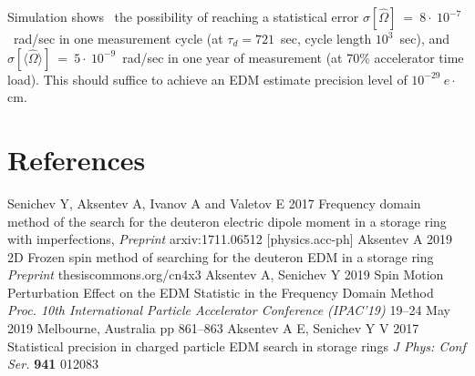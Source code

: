 \documentclass[a4paper]{jpconf}
\newcommand{\avg}[1]{\langle{#1}\rangle}
\newcommand{\W}{\Omega}
\begin{document}
Simulation shows~\cite{Stats} the possibility of reaching a statistical error $\sigma[\hat\W]~=~8\cdot~10^{-7}$~rad/sec in one measurement cycle (at $\tau_d = 721$~sec, cycle length $10^3$~sec), and $\sigma[\avg{\hat\W}]~=~5\cdot~10^{-9}$~rad/sec in one year of measurement (at 70\% accelerator time load). This should suffice to achieve an EDM estimate precision level of $10^{-29}~e\cdot$cm.

\section*{References}
\begin{thebibliography}{4}
	Senichev Y, Aksentev A, Ivanov A and Valetov E  2017 Frequency domain method of the search for
	the deuteron electric dipole moment in a storage ring with imperfections, \textit{Preprint} arxiv:1711.06512 [physics.acc-ph]
	Aksentev A 2019 2D Frozen spin method of searching for the deuteron EDM in a storage ring \textit{Preprint} thesiscommons.org/cn4x3
	Aksentev A, Senichev Y 2019 Spin Motion Perturbation Effect on the EDM Statistic
	in the Frequency Domain Method \textit{Proc. 10th International Particle Accelerator Conference (IPAC'19)} 19--24 May 2019 Melbourne, Australia pp 861--863
	Aksentev A E, Senichev Y V 2017 Statistical precision in charged particle EDM search in storage rings \textit{J Phys: Conf Ser.} \textbf{941} 012083
	
\end{thebibliography}
\end{document}
